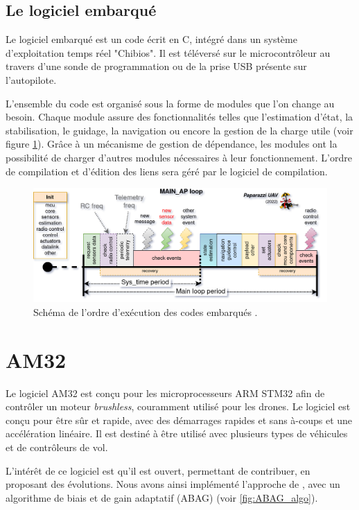  \subsection{Le logiciel embarqué}
 Le logiciel embarqué est un code écrit en C, intégré dans un système d'exploitation temps réel "Chibios". Il est téléversé sur le microcontrôleur au travers d'une sonde de programmation ou de la prise USB présente sur l'autopilote.

 L'ensemble du code est organisé sous la forme de modules que l'on change au besoin. Chaque module assure des fonctionnalités telles que l'estimation d'état, la stabilisation, le guidage, la navigation ou encore la gestion de la charge utile (voir figure \ref{fig:schedulingpaparazzi}). Grâce à un mécanisme de gestion de dépendance, les modules ont la possibilité de charger d'autres modules nécessaires à leur fonctionnement. L'ordre de compilation et d'édition des liens sera géré par le logiciel de compilation.


 \begin{figure}[ht!]
    \centerline{
    \includegraphics[trim=0cm 0cm 0cm 0cm,clip,width=0.7\columnwidth]{figures/PPRZ_Main_ap_loop.png}}
    \caption{Schéma de l'ordre d'exécution des codes embarqués \cite{RTDpaparazzi2022}.}
    \label{fig:schedulingpaparazzi}
\end{figure}

 
\section{AM32}
\label{sec:AM32}
Le logiciel AM32 est conçu pour les microprocesseurs ARM STM32 afin de contrôler un moteur \textit{brushless}, couramment utilisé pour les drones. Le logiciel est conçu pour être sûr et rapide, avec des démarrages rapides et sans à-coups et une accélération linéaire. Il est destiné à être utilisé avec plusieurs types de véhicules et de contrôleurs de vol. 

L'intérêt de ce logiciel est qu'il est ouvert, permettant de contribuer, en proposant des évolutions. Nous avons ainsi implémenté l'approche de \cite{franchi2017}, avec un algorithme de biais et de gain adaptatif (ABAG) (voir \ref{fig:ABAG_algo}).

